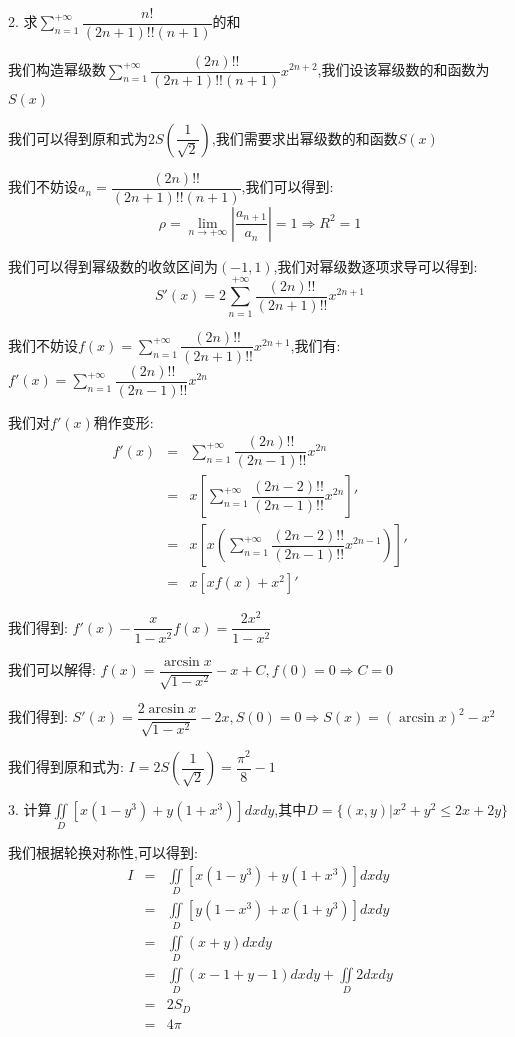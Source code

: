 2. 求$\sum\limits_{n=1}^{+\infty}\dfrac{n!}{(2n+1)!!(n+1)}$的和
\begin{solution}

	我们构造幂级数$\sum\limits_{n=1}^{+\infty}\dfrac{(2n)!!}{(2n+1)!!(n+1)}x^{2n+2}$,我们设该幂级数的和函数为$S(x)$
	
	我们可以得到原和式为$2S(\dfrac{1}{\sqrt{2}})$,我们需要求出幂级数的和函数$S(x)$
	
	我们不妨设$a_{n}=\dfrac{(2n)!!}{(2n+1)!!(n+1)}$,我们可以得到:  
	$$\rho=\lim\limits_{n\rightarrow +\infty}|\dfrac{a_{n+1}}{a_{n}}|=1\Rightarrow R^2=1$$
	
	我们可以得到幂级数的收敛区间为$(-1,1)$,我们对幂级数逐项求导可以得到:  
	$$S'(x)=2\sum\limits_{n=1}^{+\infty}\dfrac{(2n)!!}{(2n+1)!!}x^{2n+1}$$
	
	我们不妨设$f(x)=\sum\limits_{n=1}^{+\infty}\dfrac{(2n)!!}{(2n+1)!!}x^{2n+1}$,我们有:  $f'(x)=\sum\limits_{n=1}^{+\infty}\dfrac{(2n)!!}{(2n-1)!!}x^{2n}$
	
	我们对$f'(x)$稍作变形:  
	\begin{eqnarray*}
		f'(x)&=&\sum\limits_{n=1}^{+\infty}\dfrac{(2n)!!}{(2n-1)!!}x^{2n}\\
		&=&x\left[\sum\limits_{n=1}^{+\infty}\dfrac{(2n-2)!!}{(2n-1)!!}x^{2n} \right]'\\
		&=&x\left[ x\left(\sum\limits_{n=1}^{+\infty}\dfrac{(2n-2)!!}{(2n-1)!!}x^{2n-1} \right) \right]'\\
		&=&x\left[ xf(x)+x^2\right]'   
	\end{eqnarray*}

	我们得到:  $f'(x)-\dfrac{x}{1-x^2}f(x)=\dfrac{2x^2}{1-x^2}$
	
	我们可以解得:  $f(x)=\dfrac{\arcsin x}{\sqrt{1-x^2}}-x+C,f(0)=0\Rightarrow C=0$
	
	我们得到:  $S'(x)=\dfrac{2\arcsin x}{\sqrt{1-x^2}}-2x,S(0)=0\Rightarrow S(x)=(\arcsin x)^2-x^2$
	
	我们得到原和式为:  $I=2S(\dfrac{1}{\sqrt{2}})=\dfrac{\pi^2}{8}-1$
\end{solution}

3. 计算$\iint\limits_{D}\left[ x(1-y^3)+y(1+x^3)\right]dxdy$,其中$D=\{(x,y)|x^2+y^2\leq 2x+2y\}$
\begin{solution}

	我们根据轮换对称性,可以得到:
	\begin{eqnarray*}
		I&=&\iint\limits_{D}\left[ x(1-y^3)+y(1+x^3)\right]dxdy\\
		&=&\iint\limits_{D}\left[ y(1-x^3)+x(1+y^3)\right]dxdy\\
		&=&\iint\limits_{D}(x+y)dxdy\\
		&=&\iint\limits_{D}(x-1+y-1)dxdy+\iint\limits_{D}2dxdy\\
		&=&2S_{D}\\
		&=&4\pi
	\end{eqnarray*}
\end{solution}

